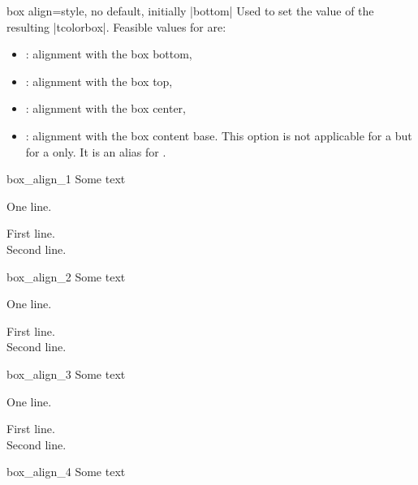 \begin{docTcbKey}[][doc new=2014-10-10]{box align}{=}{style, no default, initially |bottom|}
  Used to set the  value of the resulting |tcolorbox|.
  Feasible values for  are:
  \begin{itemize}
  \item{}: alignment with the box bottom,
  \item{}: alignment with the box top,
  \item{}: alignment with the box center,
  \item{}: alignment with the box content base. This option
    is not applicable for a  but for a  only.
    It is an alias for .
  \end{itemize}

\begin{exdispExample}{box_align_1}
Some text\dotfill
\begin{tcolorbox}[box align=bottom]
One line.
\end{tcolorbox}
\begin{tcolorbox}[box align=bottom]
First line.\\Second line.
\end{tcolorbox}
\end{exdispExample}

\begin{exdispExample}{box_align_2}
Some text\dotfill
\begin{tcolorbox}[box align=top]
One line.
\end{tcolorbox}
\begin{tcolorbox}[box align=top]
First line.\\Second line.
\end{tcolorbox}
\end{exdispExample}

\begin{exdispExample}{box_align_3}
Some text\dotfill
\begin{tcolorbox}[box align=center]
One line.
\end{tcolorbox}
\begin{tcolorbox}[box align=center]
First line.\\Second line.
\end{tcolorbox}
\end{exdispExample}

\begin{exdispExample}{box_align_4}
Some text\dotfill
{}
\end{exdispExample}
\end{docTcbKey}





